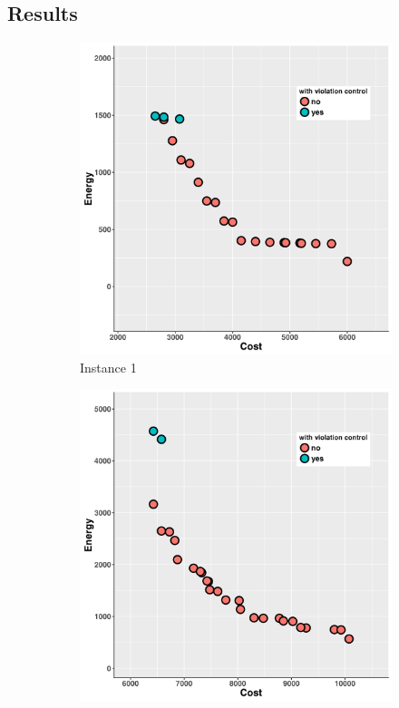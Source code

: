 \subsection{Results}
\label{sec:results}
\begin{figure}
   \centering
   \begin{subfigure}[b]{0.45\textwidth}\includegraphics[width=\textwidth]{pics/preliminary/1/evolve.png}
   \caption{Instance 1}
   \label{fig:a}
   \end{subfigure}
   \begin{subfigure}[b]{0.45\textwidth}\includegraphics[width=\textwidth]{pics/preliminary/2/evolve.png}

\end{subfigure}
\end{figure}
